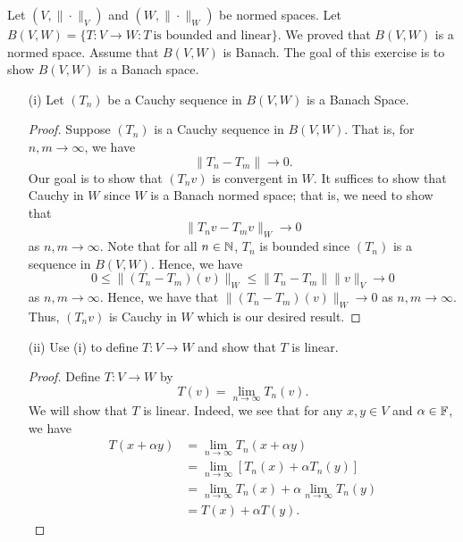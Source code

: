 \documentclass[a4paper]{article}
\begin{document}
\begin{problem}
    Let \( (V , \|\cdot\|_V ) \) and \( (W, \|\cdot\|_W ) \) be normed spaces. Let \( B(V,W) = \{ T: V \to W  : T \ \text{is bounded and linear} \}.   \)
    We proved that \( B(V,W) \) is a normed space. Assume that \( B(V,W) \) is Banach. The goal of this exercise is to show \( B(V,W) \) is a Banach space.
\end{problem}
\begin{enumerate}
    \item[(i)] Let \( ({T}_{n}) \) be a Cauchy sequence in \( B(V,W) \) is a Banach Space.
        \begin{proof}
        Suppose \( ({T}_{n}) \) is a Cauchy sequence in \( B(V,W) \). That is, for \( n,m \to \infty   \), we have
        \[  \|{T}_{n} - {T}_{m} \| \to 0. \] 
        Our goal is to show that \( ({T}_{n}v ) \) is convergent in \( W  \). It suffices to show that Cauchy in \( W \) since \( W  \) is a Banach normed space; that is, we need to show that 
        \[  \|{T}_{n} v - {T}_{m}v \|_W \to 0   \]
        as \( n,m \to \infty   \). Note that for all \( n \in \mathbb{N} \), \( {T}_{n} \) is bounded since \( ({T}_{n})   \) is a sequence in \( B(V,W) \). Hence, we have 
        \[ 0 \leq \|({T}_{n} - {T}_{m})(v) \|_{W} \leq \|{T}_{n} - {T}_{m}\| \|v\|_{V} \to 0     \]
        as \( n,m \to \infty   \). Hence, we have that \( \|({T}_{n} - {T}_{m})(v)\|_W \to 0  \) as \( n, m \to \infty   \). Thus, \( ({T}_{n}v ) \) is Cauchy in \( W  \) which is our desired result.
        \end{proof}
    \item[(ii)] Use (i) to define \( T: V \to W  \) and show that \( T  \) is linear.
        \begin{proof} Define \( T: V \to W  \) by  
        \[  T(v) = \lim_{ n \to \infty } {T}_{n}(v).  \]
        We will show that \( T  \) is linear. Indeed, we see that for any \( x,y \in V  \) and \( \alpha \in \mathbb{F}  \), we have
        \begin{align*}
            T(x + \alpha y) &= \lim_{ n \to \infty  }  {T}_{n}(x + \alpha y ) \\
                            &= \lim_{ n \to \infty  }  [{T}_{n}(x) + \alpha {T}_{n}(y) ] \\
                            &= \lim_{ n \to \infty  }  {T}_{n}(x) + \alpha \lim_{ n \to \infty  }  {T}_{n}(y) \\
                            &= T(x) + \alpha T(y).
        \end{align*}
        \end{proof}

\end{enumerate}
\end{document}
